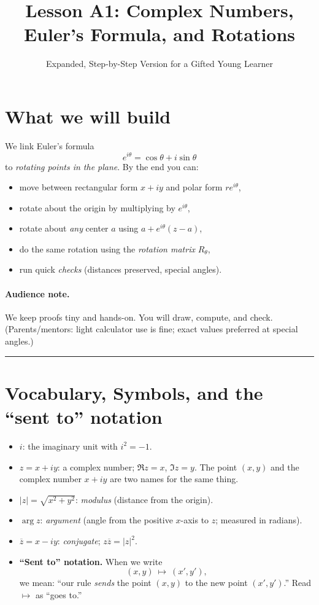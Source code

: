 \documentclass[11pt]{article}
\title{Lesson A1: Complex Numbers, Euler's Formula, and Rotations}
\author{Expanded, Step-by-Step Version for a Gifted Young Learner}
\date{}
\begin{document}
\maketitle

\section*{What we will build}
We link Euler's formula
\[
e^{i\theta}=\cos\theta+i\sin\theta
\]
to \emph{rotating points in the plane}. By the end you can:
\begin{itemize}
  \item move between rectangular form \(x+iy\) and polar form \(re^{i\theta}\),
  \item rotate about the origin by multiplying by \(e^{i\theta}\),
  \item rotate about \emph{any} center \(a\) using \(a+e^{i\theta}(z-a)\),
  \item do the same rotation using the \emph{rotation matrix} \(R_\theta\),
  \item run quick \emph{checks} (distances preserved, special angles).
\end{itemize}

\paragraph{Audience note.} We keep proofs tiny and hands-on. You will draw, compute, and check. (Parents/mentors: light calculator use is fine; exact values preferred at special angles.)

\bigskip
\hrule
\bigskip

\section*{Vocabulary, Symbols, and the “sent to” notation}
\begin{itemize}
  \item \(i\): the imaginary unit with \(i^2=-1\).
  \item \(z=x+iy\): a complex number; \(\Re z=x\), \(\Im z=y\). The point \((x,y)\) and the complex number \(x+iy\) are two names for the same thing.
  \item \(|z|=\sqrt{x^2+y^2}\): \emph{modulus} (distance from the origin).
  \item \(\arg z\): \emph{argument} (angle from the positive \(x\)-axis to \(z\); measured in radians).
  \item \(\overline{z}=x-iy\): \emph{conjugate}; \(z\overline{z}=|z|^2\).
  \item \textbf{“Sent to” notation.} When we write
  \[
     (x,y)\ \mapsto\ (x',y'),
  \]
  we mean: “our rule \emph{sends} the point \((x,y)\) to the new point \((x',y')\).” Read \(\mapsto\) as “goes to.”
\end{itemize}
\end{document}
